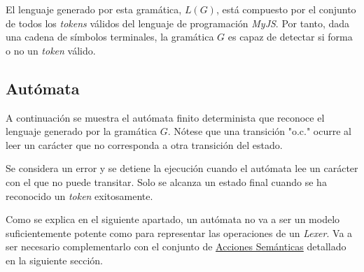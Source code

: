 \documentclass[a4paper]{CSMakotoTechnicalReport}
\begin{document}
     El lenguaje generado por esta gramática, $L(G)$, está compuesto por el conjunto de todos los \textit{tokens} válidos del lenguaje de programación \textit{MyJS}. Por tanto, dada una cadena de símbolos terminales, la gramática $G$ es capaz de detectar si forma o no un \textit{token} válido.


    \subsection{Autómata}

    A continuación se muestra el autómata finito determinista que reconoce el lenguaje generado por la gramática $G$. Nótese que una transición "o.c." ocurre al leer un carácter que no corresponda a otra transición del estado.

    Se considera un error y se detiene la ejecución cuando el autómata lee un carácter con el que no puede transitar. Solo se alcanza un estado final cuando se ha reconocido un \textit{token} exitosamente.

    Como se explica en el siguiente apartado, un autómata no va a ser un modelo suficientemente potente como para representar las operaciones de un \textit{Lexer}. Va a ser necesario complementarlo con el conjunto de \hyperref[subsec:acciones-semanticas]{Acciones Semánticas} detallado en la siguiente sección.

    \vspace{0.02\textheight}
\end{document}
